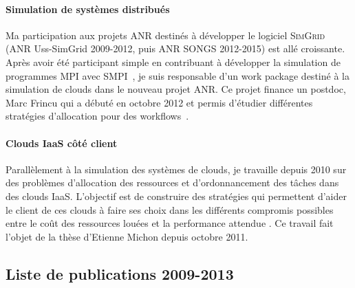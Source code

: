 \documentclass[11pt]{article}
\begin{document}
\paragraph{Simulation de systèmes distribués}
Ma   participation  aux   projets  ANR   destinés  à   développer  le   logiciel
\textsc{SimGrid} (ANR Uss-SimGrid 2009-2012,  puis ANR SONGS 2012-2015) est
allé croissante. Après avoir été  participant simple en contribuant à développer
la  simulation  de  programmes   MPI  avec  SMPI~\cite{icps-2011-224},  je  suis
responsable d'un work package destiné à  la simulation de clouds dans le nouveau
projet ANR. Ce  projet finance un postdoc,  Marc Frincu qui a  débuté en octobre
2012  et   permis  d'étudier   différentes  stratégies  d'allocation   pour  des
workflows~\cite{FrincuGG13}.


\paragraph{Clouds IaaS côté client}
Parallèlement à la  simulation des systèmes de clouds, je  travaille depuis 2010
sur des  problèmes d'allocation  des ressources  et d'ordonnancement  des tâches
dans des clouds IaaS. L'objectif est de construire des stratégies qui permettent
d'aider le client de ces clouds à  faire ses choix dans les différents compromis
possibles  entre  le coût  des  ressources  louées  et la  performance  attendue
\cite{icps-2011-225,michon2012}. Ce travail fait l'objet de la thèse d'Etienne 
Michon depuis octobre 2011.



\subsection{Liste de publications 2009-2013}
\end{document}
